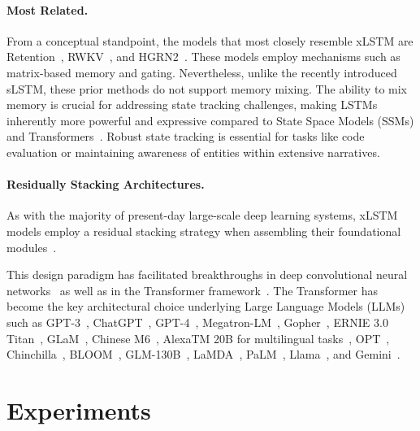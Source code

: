 \paragraph{Most Related.} From a conceptual standpoint, the models that most closely resemble xLSTM are Retention~\citep{Sun:23arxiv}, RWKV~\citep{Peng:23arxivshort,Peng:24arxivshort}, and HGRN2~\citep{Qin:24arxiv}. These models employ mechanisms such as matrix-based memory and gating. Nevertheless, unlike the recently introduced sLSTM, these prior methods do not support memory mixing. The ability to mix memory is crucial for addressing state tracking challenges, making LSTMs inherently more powerful and expressive compared to State Space Models (SSMs) and Transformers~\citep{Merrill:24,Deletang:23}. Robust state tracking is essential for tasks like code evaluation or maintaining awareness of entities within extensive narratives.

\paragraph{Residually Stacking Architectures.} As with the majority of present-day large-scale deep learning systems, xLSTM models employ a residual stacking strategy when assembling their foundational modules~\citep{Srivastava:15,He:16}.

This design paradigm has facilitated breakthroughs in deep convolutional neural networks~\citep{He:16} as well as in the Transformer framework~\citep{Vaswani:17}. The Transformer has become the key architectural choice underlying Large Language Models (LLMs) such as GPT-3~\citep{Brown:20short}, ChatGPT~\citep{Schulman:22short}, GPT-4~\citep{Achiam:23gpt4short}, Megatron-LM~\citep{Shoeybi:19}, Gopher~\citep{Rae:21short}, ERNIE 3.0 Titan~\citep{Wang:21arxivshort}, GLaM~\citep{Du:21glamshort}, Chinese M6~\citep{Lin:21}, AlexaTM 20B for multilingual tasks~\citep{Soltan:22}, OPT~\citep{Zhang:22opt}, Chinchilla~\citep{Hoffmann:22short}, BLOOM~\citep{Scao:22arxivshort}, GLM-130B~\citep{Zeng:22arxivshort}, LaMDA~\citep{Thoppilan:22short}, PaLM~\citep{Chowdhery:22short}, Llama~\citep{Touvron:23arxiv}, and Gemini~\citep{GeminiTeam:23arxiv,Reid:24arxiv}.

\section{Experiments}
\label{sec:Exp}

